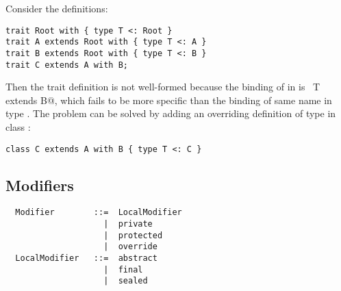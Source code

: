 \documentclass[a4paper,12pt,twoside,titlepage]{book}
\begin{document}
\example\label{ex:compound-a}
Consider the definitions:
\begin{lstlisting}
trait Root with { type T <: Root }
trait A extends Root with { type T <: A }
trait B extends Root with { type T <: B }
trait C extends A with B;
\end{lstlisting}
Then the trait definition  is not well-formed because the
binding of  in  is
~\lstinline@type T extends B@,
which fails to be more specific than the binding of same name in type
. The problem can be solved by adding an overriding 
definition of type  in class :
\begin{lstlisting}
class C extends A with B { type T <: C }
\end{lstlisting}

\subsection{Modifiers}
\label{sec:modifiers}

\syntax\begin{lstlisting}
  Modifier        ::=  LocalModifier
                    |  private
                    |  protected
                    |  override 
  LocalModifier   ::=  abstract
                    |  final
                    |  sealed
\end{lstlisting}
\end{document}
